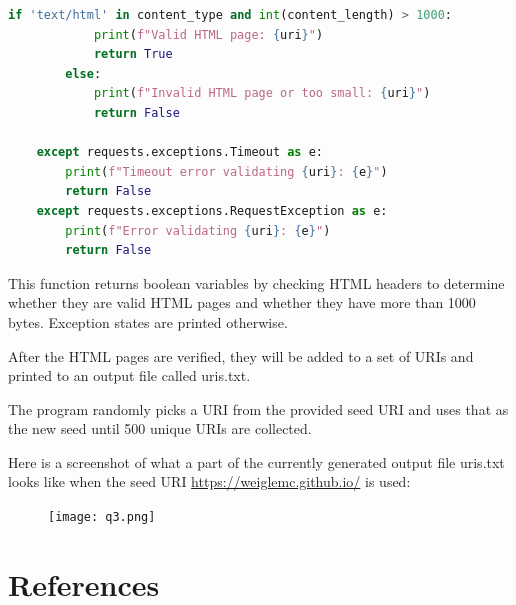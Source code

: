 \documentclass[12pt]{article}
\begin{document}
\begin{enumerate}
\begin{lstlisting}[language=Python, label=1st:copy]
        if 'text/html' in content_type and int(content_length) > 1000:
            print(f"Valid HTML page: {uri}")
            return True
        else:
            print(f"Invalid HTML page or too small: {uri}")
            return False
    
    except requests.exceptions.Timeout as e:
        print(f"Timeout error validating {uri}: {e}")
        return False
    except requests.exceptions.RequestException as e:
        print(f"Error validating {uri}: {e}")
        return False
     \end{lstlisting}
    This function returns boolean variables by checking HTML headers to determine whether they are valid HTML pages and whether they have more than 1000 bytes. Exception states are printed otherwise.

    After the HTML pages are verified, they will be added to a set of URIs and printed to an output file called uris.txt.  
     
\end{enumerate}

The program randomly picks a URI from the provided seed URI and uses that as the new seed until 500 unique URIs are collected.

Here is a screenshot of what a part of the currently generated output file uris.txt looks like when the seed URI \url{https://weiglemc.github.io/} is used:
\begin{figure}[h!]
    \centering
    \texttt{[image: q3.png]}
    \label{fig:q3}
\end{figure}

\section*{References}
\end{document}
